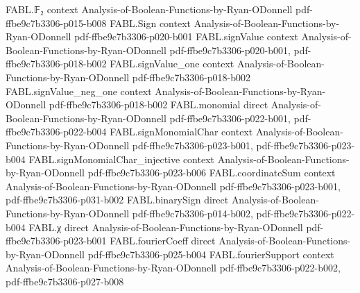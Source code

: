 \begin{theorem}
\label{FABL.RandomizedDecisionTree.complexity_le_deterministicDepth}
\leanok
{}
\proofstep
  {FABL.𝔽₂}
  {context}
  {Analysis-of-Boolean-Functions-by-Ryan-ODonnell}
  {pdf-ffbe9c7b3306-p015-b008}
\proofstep
  {FABL.Sign}
  {context}
  {Analysis-of-Boolean-Functions-by-Ryan-ODonnell}
  {pdf-ffbe9c7b3306-p020-b001}
\proofstep
  {FABL.signValue}
  {context}
  {Analysis-of-Boolean-Functions-by-Ryan-ODonnell}
  {pdf-ffbe9c7b3306-p020-b001,
    pdf-ffbe9c7b3306-p018-b002}
\proofstep
  {FABL.signValue_one}
  {context}
  {Analysis-of-Boolean-Functions-by-Ryan-ODonnell}
  {pdf-ffbe9c7b3306-p018-b002}
\proofstep
  {FABL.signValue_neg_one}
  {context}
  {Analysis-of-Boolean-Functions-by-Ryan-ODonnell}
  {pdf-ffbe9c7b3306-p018-b002}
\proofstep
  {FABL.monomial}
  {direct}
  {Analysis-of-Boolean-Functions-by-Ryan-ODonnell}
  {pdf-ffbe9c7b3306-p022-b001,
    pdf-ffbe9c7b3306-p022-b004}
\proofstep
  {FABL.signMonomialChar}
  {context}
  {Analysis-of-Boolean-Functions-by-Ryan-ODonnell}
  {pdf-ffbe9c7b3306-p023-b001,
    pdf-ffbe9c7b3306-p023-b004}
\proofstep
  {FABL.signMonomialChar_injective}
  {context}
  {Analysis-of-Boolean-Functions-by-Ryan-ODonnell}
  {pdf-ffbe9c7b3306-p023-b006}
\proofstep
  {FABL.coordinateSum}
  {context}
  {Analysis-of-Boolean-Functions-by-Ryan-ODonnell}
  {pdf-ffbe9c7b3306-p023-b001,
    pdf-ffbe9c7b3306-p031-b002}
\proofstep
  {FABL.binarySign}
  {direct}
  {Analysis-of-Boolean-Functions-by-Ryan-ODonnell}
  {pdf-ffbe9c7b3306-p014-b002,
    pdf-ffbe9c7b3306-p022-b004}
\proofstep
  {FABL.χ}
  {direct}
  {Analysis-of-Boolean-Functions-by-Ryan-ODonnell}
  {pdf-ffbe9c7b3306-p023-b001}
\proofstep
  {FABL.fourierCoeff}
  {direct}
  {Analysis-of-Boolean-Functions-by-Ryan-ODonnell}
  {pdf-ffbe9c7b3306-p025-b004}
\proofstep
  {FABL.fourierSupport}
  {context}
  {Analysis-of-Boolean-Functions-by-Ryan-ODonnell}
  {pdf-ffbe9c7b3306-p022-b002,
    pdf-ffbe9c7b3306-p027-b008}

\end{theorem}
